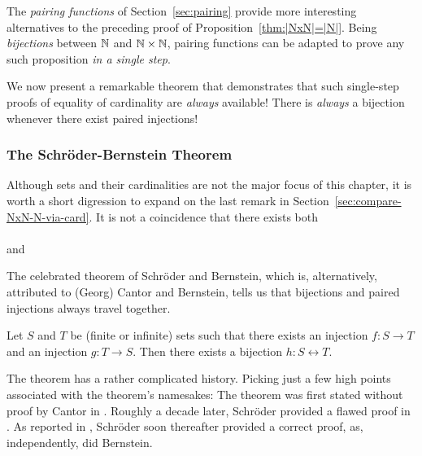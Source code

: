 \medskip

The {\it pairing functions} of Section~\ref{sec:pairing} provide more
interesting alternatives to the preceding proof of
Proposition~\ref{thm:|NxN|=|N|}.  Being {\em bijections} between $\N$
and $\N \times \N$, pairing functions can be adapted to prove any such
proposition {\em in a single step}. 

\medskip

We now present a remarkable theorem that demonstrates that such
single-step proofs of equality of cardinality are {\em always}
available!  There is {\em always} a bijection whenever there exist
paired injections!


\subsubsection{The Schr\"{o}der-Bernstein Theorem}
\label{sec:schroeder-bernstein}

Although sets and their cardinalities are not the major focus of this
chapter, it is worth a short digression to expand on the last remark
in Section~\ref{sec:compare-NxN-N-via-card}.  It is not a coincidence
that there exists both \\
\hspace*{.35in}{\em a bijection between $\N$ and $\N \times \N$} \\
and \\
\hspace*{.35in}{\em an injection from $\N$ to $\N \times \N$ and an
  injection from $\N \times \N$ to $\N$.}

\noindent
The celebrated theorem of Schr\"{o}der and Bernstein,
which is, alternatively, attributed to (Georg) Cantor and Bernstein, 
tells us that bijections and paired injections always travel together.

\begin{theorem}
\label{thm.S-B}
Let $S$ and $T$ be (finite or infinite) sets such that there exists an
injection $f: S \rightarrow T$ and an injection $g: T \rightarrow S$.
Then there exists a bijection $h: S \leftrightarrow T$.
\end{theorem}

The theorem has a rather complicated history.  Picking just a few high
points associated with the theorem's namesakes: The theorem was first
stated without proof by Cantor in \cite{Cantor87}.  Roughly a decade
later, Schr\"{o}der provided a flawed proof in \cite{Schroeder98a}.
As reported in \cite{Deiser2010}, Schr\"{o}der soon thereafter
provided a correct proof, as, independently, did Bernstein.

